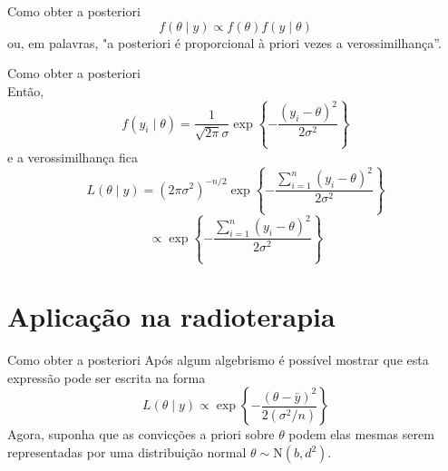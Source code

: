 \documentclass{beamer}
\theoremstyle{definition}
\begin{document}
\begin{frame}{Como obter a posteriori}
$$f(\theta \mid y) \propto f(\theta) f(y \mid \theta)$$
ou, em palavras, "a posteriori é proporcional à priori vezes a verossimilhança”.
\end{frame}
\begin{frame}{Como obter a posteriori}
\\
Então,
\begin{equation}
  f\left(y_i \mid \theta\right)=\frac{1}{\sqrt{2 \pi} \sigma} \exp \left\{-\frac{\left(y_i-\theta\right)^2}{2 \sigma^2}\right\}
\end{equation}
e a verossimilhança fica
\begin{equation}
  L(\theta \mid y) =\left(2 \pi \sigma^2\right)^{-n / 2} \exp \left\{-\frac{\sum_{i=1}^n\left(y_i-\theta\right)^2}{2 \sigma^2}\right\}
  \end{equation}
  $$\propto \exp \left\{-\frac{\sum_{i=1}^n\left(y_i-\theta\right)^2}{2 \sigma^2}\right\}$$
\end{frame}

\section{Aplicação na radioterapia}

\begin{frame}{Como obter a posteriori}
   Após algum algebrismo é possível mostrar que esta expressão pode ser escrita na
forma
\begin{equation}
    L(\theta \mid y) \propto \exp \left\{-\frac{(\theta-\bar{y})^2}{2\left(\sigma^2 / n\right)}\right\}
\end{equation}
Agora, suponha que as convicções a priori sobre $\theta$ podem elas mesmas serem representadas por uma distribuição normal $\theta \sim \mathrm{N}\left(b, d^2\right)$.
\end{frame}
\end{document}

